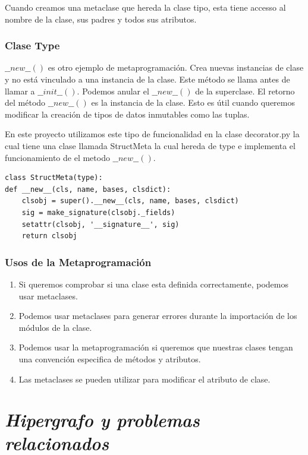 \documentclass{cosas/tfg_domingo}
\begin{document}
Cuando creamos una metaclase que hereda la clase tipo, esta tiene accesso al nombre de la clase, sus padres y todos sus atributos.

\subsection{Clase Type}
$\_\_new\_\_()$ es otro ejemplo de metaprogramación. Crea nuevas instancias de clase y no está vinculado a una instancia de la clase. Este método se llama antes de llamar a $\_\_init\_\_()$. Podemos anular el $\_\_new\_\_()$ de la superclase.
El retorno del método $\_\_new\_\_()$ es la instancia de la clase. Esto es útil cuando queremos modificar la creación de tipos de datos inmutables como las tuplas.

En este proyecto utilizamos este tipo de funcionalidad en la clase decorator.py la cual tiene una clase llamada StructMeta la cual hereda de type e implementa el funcionamiento de el metodo $\_\_new\_\_()$.
\begin{verbatim}
class StructMeta(type):
def __new__(cls, name, bases, clsdict):
    clsobj = super().__new__(cls, name, bases, clsdict)
    sig = make_signature(clsobj._fields)
    setattr(clsobj, '__signature__', sig)
    return clsobj
\end{verbatim}

\subsection{Usos de la Metaprogramación}

\begin{enumerate}
    \item Si queremos comprobar si una clase esta definida correctamente, podemos usar metaclases.
    \item Podemos usar metaclases para generar errores durante la importación de los módulos de la clase.
    \item Podemos usar la metaprogramación si queremos que nuestras clases tengan una convención especifica de métodos y atributos.
    \item Las metaclases se pueden utilizar para modificar el atributo de clase.
    \citep{Farhad}
\end{enumerate}


\chapter{\emph{Hipergrafo y problemas relacionados}}
\end{document}
